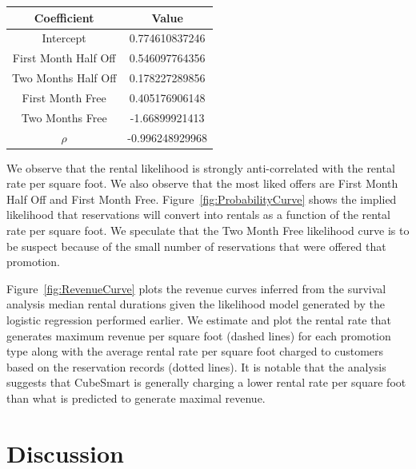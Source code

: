 \documentclass[times]{aastex6}
\begin{document}
\begin{center}
    \begin{tabular}{ | c | c |}
    \hline
    Coefficient & Value \\ \hline
    Intercept & 0.774610837246 \\
    First Month Half Off & 0.546097764356 \\
    Two Months Half Off & 0.178227289856 \\
    First Month Free & 0.405176906148 \\
    Two Months Free & -1.66899921413 \\
    $\rho$ & -0.996248929968 \\
    \hline
    \end{tabular}
\end{center}

We observe that the rental likelihood is strongly anti-correlated with the rental rate per square foot. We also observe that the most liked offers are First Month Half Off and First Month Free. Figure~\ref{fig:ProbabilityCurve} shows the implied likelihood that reservations will convert into rentals as a function of the rental rate per square foot. We speculate that the Two Month Free likelihood curve is to be suspect because of the small number of reservations that were offered that promotion.

Figure~\ref{fig:RevenueCurve} plots the revenue curves inferred from the survival analysis median rental durations given the likelihood model generated by the logistic regression performed earlier. We estimate and plot the rental rate that generates maximum revenue per square foot (dashed lines) for each promotion type along with the average rental rate per square foot charged to customers based on the reservation records (dotted lines). It is notable that the analysis suggests that CubeSmart is generally charging a lower rental rate per square foot than what is predicted to generate maximal revenue.

\section{Discussion}\label{sec:Discussion}
\end{document}
